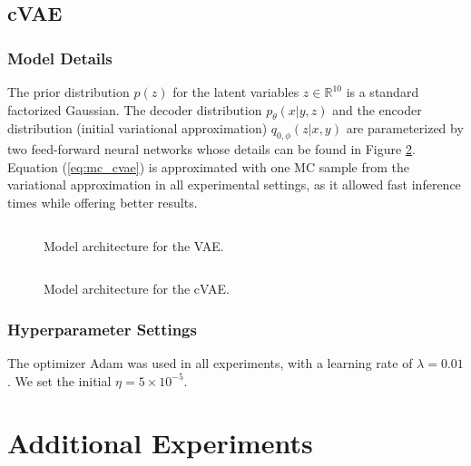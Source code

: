 \subsection{cVAE}




\subsubsection{Model Details}

The prior distribution $p(z)$ for the latent variables $z \in \mathbb{R}^{10}$ is a standard factorized Gaussian. The decoder distribution $p_\theta(x|y,z)$ and the encoder distribution (initial variational approximation) $q_{0,\phi}(z|x,y)$ are parameterized by two feed-forward neural networks whose details can be found in Figure \ref{fig:arch}.
Equation (\ref{eq:mc_cvae}) is approximated with one MC sample from the variational approximation in all experimental settings, {as it allowed fast inference times while offering better results.}


\begin{figure}[h]
\inputminted[fontsize=\scriptsize]{python}{img/arch_vae.tex}
\caption{Model architecture for the VAE.}
\label{fig:arch_vae}
\end{figure}
\unskip
\begin{figure}[h]

\inputminted[fontsize=\scriptsize]{python}{img/arch.tex}
\caption{Model architecture for the cVAE.}
\label{fig:arch}
\end{figure}


\subsubsection{Hyperparameter Settings}
The optimizer Adam was used in all experiments, with a learning rate of $\lambda=0.01$. We set the initial $\eta = 5 \times 10^{-5}$.




\iffalse
\section{Additional Experiments}

